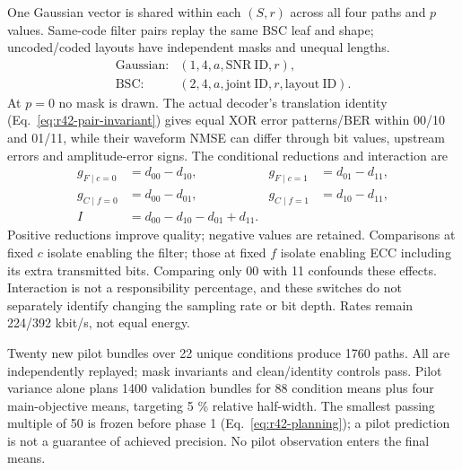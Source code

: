 One Gaussian vector is shared within each $(S,r)$ across all four paths
and $ p $ values. Same-code filter pairs replay the same BSC leaf and shape;
uncoded/coded layouts have independent masks and unequal lengths.
\begin{align}
 \text{Gaussian}:&(1,4,a,\mathrm{SNR\ ID},r),\nonumber\\
 \text{BSC}:&(2,4,a,\mathrm{joint\ ID},r,\mathrm{layout\ ID}).
 \label{eq:r42-rng}
\end{align}
At $ p=0 $ no mask is drawn. The actual decoder's translation identity
(Eq.~\eqref{eq:r42-pair-invariant}) gives equal XOR error patterns/BER
within 00/10 and 01/11, while their waveform NMSE can differ through
bit values, upstream errors and amplitude-error signs.
The conditional reductions and interaction are
\begin{align}
 g_{F\mid c=0}&=d_{00}-d_{10},&
 g_{F\mid c=1}&=d_{01}-d_{11},\nonumber\\
 g_{C\mid f=0}&=d_{00}-d_{01},&
 g_{C\mid f=1}&=d_{10}-d_{11},\nonumber\\
 I&=d_{00}-d_{10}-d_{01}+d_{11}.
 \label{eq:r42-effects}
\end{align}
Positive reductions improve quality; negative values are retained.
Comparisons at fixed $ c $ isolate enabling the filter; those at fixed $ f $
isolate enabling ECC including its extra transmitted bits. Comparing only
00 with 11 confounds these effects. Interaction is not a responsibility
percentage, and these switches do not separately identify changing the
sampling rate or bit depth. Rates remain 224/392 kbit/s, not equal energy.

Twenty new pilot bundles over 22 unique conditions produce 1760 paths.
All are independently replayed; mask invariants and clean/identity controls
pass. Pilot variance alone plans 1400 validation bundles for 88 condition
means plus four main-objective means, targeting 5 \% relative half-width.
The smallest passing multiple of 50 is frozen before phase 1
(Eq.~\eqref{eq:r42-planning}); a pilot prediction is not a guarantee of
achieved precision. No pilot observation enters the final means.
